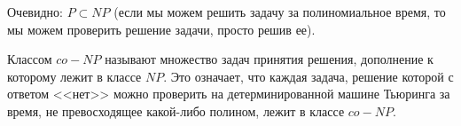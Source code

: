     \begin{Rem}
        Очевидно: $P \subset NP$ (если мы можем решить задачу за полиномиальное время, то мы можем проверить решение задачи, просто решив ее).
    \end{Rem}
    \begin{Def}
        Классом $co-NP$ называют множество задач принятия решения, дополнение к которому лежит в классе $NP$. Это означает, что каждая задача, решение которой с ответом <<нет>> можно проверить на детерминированной машине Тьюринга за время, не превосходящее какой-либо полином, лежит в классе $co-NP$.
    \end{Def}
    \begin{Def}

    \end{Def}
